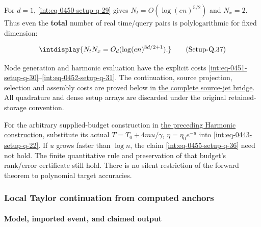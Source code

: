 
For \(d=1\), \hyperref[int:eq-setup-q-29]{\eqref{int:eq-0450-setup-q-29}} gives \(N_t=O(\log(en)^{5/2})\) and \(N_x=2\). Thus even the \textbf{total} number of real time/query pairs is polylogarithmic for fixed dimension:


\label{int:eq-setup-q-37}
\begingroup\renewcommand{\theHequation}{intdisplay.910}
\begin{equation}
\intdisplay{
N_tN_x=O_d(\log(en)^{3d/2+1}).
}
\tag{Setup-Q.37}
\label{int:eq-0456-setup-q-37}
\end{equation}
\endgroup


Node generation and harmonic evaluation have the explicit costs \hyperref[int:eq-setup-q-30]{\eqref{int:eq-0451-setup-q-30}}--\allowbreak \hyperref[int:eq-setup-q-31]{\eqref{int:eq-0452-setup-q-31}}. The continuation, source projection, selection and assembly costs are proved below in \hyperref[int:setup-bridge]{the complete source-jet bridge}. All quadrature and dense setup arrays are discarded under the original retained-storage convention.



For the arbitrary supplied-budget construction in \hyperref[int:harmonic-construction]{the preceding Harmonic construction}, substitute its actual \(T=T_0+4mu/\gamma\), \(\eta=\eta_0e^{-u}\) into \hyperref[int:eq-setup-q-22]{\eqref{int:eq-0443-setup-q-22}}. If \(u\) grows faster than \(\log n\), the claim \hyperref[int:eq-setup-q-36]{\eqref{int:eq-0455-setup-q-36}} need not hold. The finite quantitative rule and preservation of that budget's rank/error certificate still hold. There is no silent restriction of the forward theorem to polynomial target accuracies.


\subsubsection{Local Taylor continuation from computed anchors}
\label{int:setup-core}

\paragraph{Model, imported event, and claimed output}
\label{int:setup-core-1}
\mbox{}\par\smallskip

